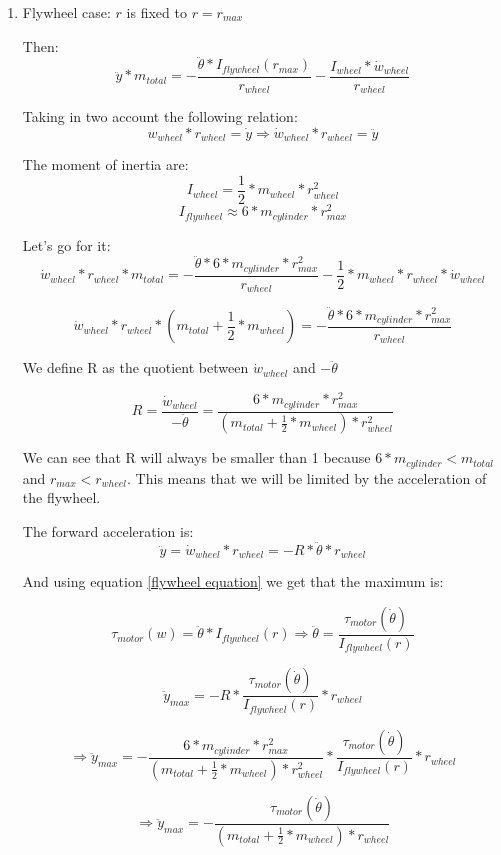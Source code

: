 \begin{enumerate}
    \item Flywheel case: $r$ is fixed to $r = r_{max}$ 
    
    Then:  
    \[\ddot{y}*m_{total} = - \frac{\ddot{\theta}*I_{flywheel}(r_{max})}{r_{wheel}} - \frac{I_{wheel} * \dot{w}_{wheel}}{r_{wheel}}\]

    Taking in two account the following relation:
    \[w_{wheel} * r_{wheel} = \dot{y} \Rightarrow  \dot{w}_{wheel} * r_{wheel} = \ddot{y} \]

    The moment of inertia are:
    \[I_{wheel} = \frac{1}{2} *m_{wheel} * r_{wheel}^2\]
    \[I_{flywheel} \approx 6 * m_{cylinder} * r_{max}^2\]

    Let's go for it:
    \[\dot{w}_{wheel} * r_{wheel}*m_{total} = - \frac{\ddot{\theta}*6 * m_{cylinder} * r_{max}^2}{r_{wheel}} - \frac{1}{2} *m_{wheel} * r_{wheel} * \dot{w}_{wheel} \]

    \[\dot{w}_{wheel} * r_{wheel}*(m_{total}+\frac{1}{2} *m_{wheel}) = - \frac{\ddot{\theta}*6 * m_{cylinder} * r_{max}^2}{r_{wheel}}\]


    We define R as the quotient between $\dot{w}_{wheel}$ and $-\ddot{\theta}$

    \[R = \frac{\dot{w}_{wheel}}{-\ddot{\theta}} = \frac{6 * m_{cylinder} * r_{max}^2}{(m_{total} + \frac{1}{2} *m_{wheel}) * r_{wheel}^2} \]

    We can see that R will always be smaller than 1 because $6 * m_{cylinder} < m_{total} $ and $r_{max} < r_{wheel}$. This means that we will be limited by the acceleration of the flywheel.

    The forward acceleration is:
    \[\ddot{y} = \dot{w}_{wheel} * r_{wheel} = - R * \ddot{\theta} * r_{wheel}\]

    And using equation \ref{flywheel equation} we get that the maximum is:

    \[\tau_{motor} (w) = \ddot{\theta}*I_{flywheel}(r) \Rightarrow \ddot{\theta} = \frac{\tau_{motor} (\dot{\theta})}{I_{flywheel}(r)} \]

    \[\ddot{y}_{max} = - R * \frac{\tau_{motor} (\dot{\theta})}{I_{flywheel}(r)} * r_{wheel}\]

    \[\Rightarrow \ddot{y}_{max} = -\frac{6 * m_{cylinder} * r_{max}^2}{(m_{total} + \frac{1}{2} *m_{wheel}) * r_{wheel}^2} * \frac{\tau_{motor} (\dot{\theta})}{I_{flywheel}(r)} * r_{wheel}\]
    
    \[\boxed{\Rightarrow \ddot{y}_{max} = -\frac{\tau_{motor} (\dot{\theta})}{(m_{total} + \frac{1}{2} *m_{wheel}) * r_{wheel}}} \]
    

\end{enumerate}
